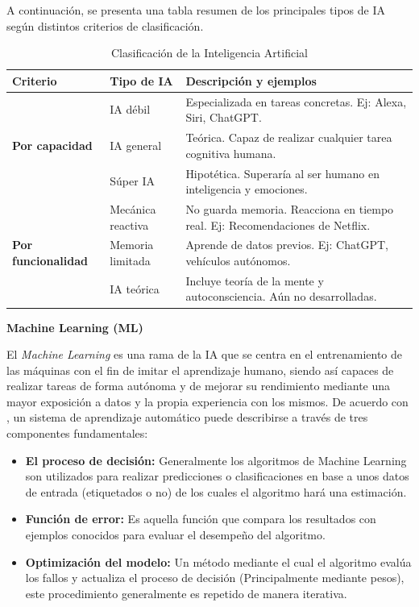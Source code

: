 A continuación, se presenta una tabla resumen de los principales tipos de IA según distintos criterios de clasificación.

\vspace{0.5cm}
\begin{table}[H]
\centering
\caption{Clasificación de la Inteligencia Artificial}
\begin{tabular}{|p{3.5cm}|p{4.5cm}|p{6cm}|}
\hline
\textbf{Criterio} & \textbf{Tipo de IA} & \textbf{Descripción y ejemplos} \\
\hline
\multirow{3}{*}{\textbf{Por capacidad}} 
& IA débil & Especializada en tareas concretas. Ej: Alexa, Siri, ChatGPT. \\
& IA general & Teórica. Capaz de realizar cualquier tarea cognitiva humana. \\
& Súper IA & Hipotética. Superaría al ser humano en inteligencia y emociones. \\
\hline
\multirow{3}{*}{\textbf{Por funcionalidad}} 
& Mecánica reactiva & No guarda memoria. Reacciona en tiempo real. Ej: Recomendaciones de Netflix. \\
& Memoria limitada & Aprende de datos previos. Ej: ChatGPT, vehículos autónomos. \\
& IA teórica & Incluye teoría de la mente y autoconsciencia. Aún no desarrolladas. \\
\hline
\end{tabular}
\label{tab:clasificacion_ia}
\end{table}


\newpage
\textbf{Machine Learning (ML)}

El \textit{Machine Learning} es una rama de la IA que se centra en el entrenamiento de las máquinas con el fin de imitar el aprendizaje humano, siendo así capaces de realizar tareas de forma autónoma y de mejorar su rendimiento mediante una mayor exposición a datos y la propia experiencia con los mismos.
De acuerdo con \cite{ibmML2024}, un sistema de aprendizaje automático puede describirse a través de tres componentes fundamentales:

    \begin{itemize}
        \item \textbf{El proceso de decisión:} Generalmente los algoritmos de Machine Learning son utilizados para realizar predicciones o clasificaciones en base a unos datos de entrada (etiquetados o no) de los cuales el algoritmo hará una estimación.
        \item \textbf{Función de error:} Es aquella función que 
        compara los resultados con ejemplos conocidos para evaluar el desempeño del algoritmo.
        \item \textbf{Optimización del modelo:} Un método mediante el cual el algoritmo evalúa los fallos y actualiza el proceso de decisión (Principalmente mediante pesos), este procedimiento generalmente es repetido de manera iterativa.
    \end{itemize}

